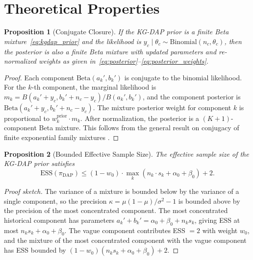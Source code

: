 \documentclass[12pt]{article}
\newtheorem{proposition}{Proposition}
\newcommand{\thetac}{\theta_c}
\newcommand{\piDAP}{\pi_{\mathrm{DAP}}}
\newcommand{\ESS}{\mathrm{ESS}}
\begin{document}
\section{Theoretical Properties}
\label{sec:theory}

\begin{proposition}[Conjugate Closure]
\label{prop:conjugate}
If the KG-DAP prior is a finite Beta mixture~\eqref{eq:kgdap_prior} and the likelihood is $y_c \mid \thetac \sim \mathrm{Binomial}(n_c, \thetac)$, then the posterior is also a finite Beta mixture with updated parameters and re-normalized weights as given in~\eqref{eq:posterior}--\eqref{eq:posterior_weights}.
\end{proposition}

\begin{proof}
Each component $\mathrm{Beta}(a_k', b_k')$ is conjugate to the binomial likelihood. For the $k$-th component, the marginal likelihood is $m_k = B(a_k' + y_c, b_k' + n_c - y_c) / B(a_k', b_k')$, and the component posterior is $\mathrm{Beta}(a_k' + y_c, b_k' + n_c - y_c)$. The mixture posterior weight for component $k$ is proportional to $w_k^{\mathrm{prior}} \cdot m_k$. After normalization, the posterior is a $(K+1)$-component Beta mixture. This follows from the general result on conjugacy of finite exponential family mixtures \citep{diaconis1979conjugate}.
\end{proof}

\begin{proposition}[Bounded Effective Sample Size]
\label{prop:ess_bound}
The effective sample size of the KG-DAP prior satisfies
\begin{equation}
\ESS(\piDAP) \leq (1 - w_0) \cdot \max_{k} (n_k \cdot s_k + \alpha_0 + \beta_0) + 2.
\label{eq:ess_bound}
\end{equation}
\end{proposition}

\begin{proof}[Proof sketch]
The variance of a mixture is bounded below by the variance of a single component, so the precision $\kappa = \mu(1-\mu)/\sigma^2 - 1$ is bounded above by the precision of the most concentrated component. The most concentrated historical component has parameters $a_k' + b_k' = \alpha_0 + \beta_0 + n_k s_k$, giving ESS at most $n_k s_k + \alpha_0 + \beta_0$. The vague component contributes ESS $= 2$ with weight $w_0$, and the mixture of the most concentrated component with the vague component has ESS bounded by $(1-w_0)(n_k s_k + \alpha_0 + \beta_0) + 2$.
\end{proof}
\end{document}
